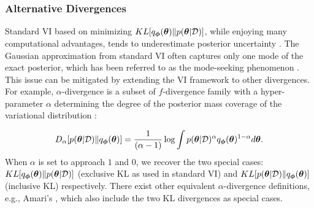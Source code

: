 \subsubsection{Alternative Divergences}

Standard VI based on minimizing $KL[q_{\bm{\phi}}(\bm{\theta})\|p(\bm{\theta}|\mathcal{D})]$, while enjoying many computational advantages,  tends to underestimate posterior uncertainty \citep{turner:two_problems2011}. The Gaussian approximation from standard VI often captures only one mode of the exact posterior, which has been referred to as the mode-seeking phenomenon \citep{miguel2015alpha, li2016renyi}. This issue can be mitigated by extending the VI framework to other divergences. For example, $\alpha$-divergence is a subset of $f$-divergence family \citep{csiszar:divergence1963} with a hyper-parameter $\alpha$ determining the degree of the posterior mass coverage of the variational distribution \citep{renyi:divergence1961,van_erven:renyi2014}:

%
%
\begin{equation}
    D_{\alpha}[ p(\bm{\theta}|\mathcal{D}) \| q_{\bm{\phi}}(\bm{\theta}) ] = \frac{1}{(\alpha-1)} \log \int p(\bm{\theta}|\mathcal{D})^{\alpha} q_{\bm{\phi}}(\bm{\theta})^{1-\alpha} d\bm{\theta}.
    \label{eq:alpha_divergence}
\end{equation}
%
When $\alpha$ is set to approach $1$ and $0$, we recover the two special cases: $KL[q_{\bm{\phi}}(\bm{\theta})\|p(\bm{\theta}|\mathcal{D})]$ (exclusive KL as used in standard VI) and  $KL[p(\bm{\theta}|\mathcal{D})\|q_{\bm{\phi}}(\bm{\theta})]$ (inclusive KL) respectively. There exist other equivalent $\alpha$-divergence definitions, e.g., Amari's \citep{amari1985differential}, which also include the two KL divergences as special cases.

